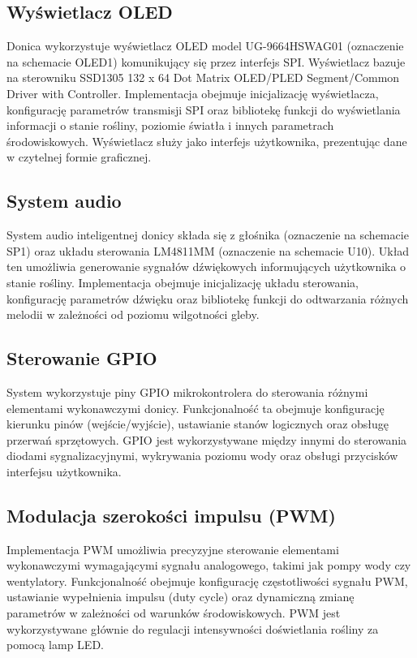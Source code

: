 \documentclass{article}
\begin{document}
\subsection{Wyświetlacz OLED}
Donica wykorzystuje wyświetlacz OLED model UG-9664HSWAG01 (oznaczenie na schemacie OLED1) komunikujący się przez interfejs SPI. Wyświetlacz bazuje na sterowniku SSD1305 132 x 64 Dot Matrix OLED/PLED Segment/Common Driver with Controller. Implementacja obejmuje inicjalizację wyświetlacza, konfigurację parametrów transmisji SPI oraz bibliotekę funkcji do wyświetlania informacji o stanie rośliny, poziomie światła i innych parametrach środowiskowych. Wyświetlacz służy jako interfejs użytkownika, prezentując dane w czytelnej formie graficznej.

\subsection{System audio}
System audio inteligentnej donicy składa się z głośnika (oznaczenie na schemacie SP1) oraz układu sterowania LM4811MM (oznaczenie na schemacie U10). Układ ten umożliwia generowanie sygnałów dźwiękowych informujących użytkownika o stanie rośliny. Implementacja obejmuje inicjalizację układu sterowania, konfigurację parametrów dźwięku oraz bibliotekę funkcji do odtwarzania różnych melodii w zależności od poziomu wilgotności gleby.

\subsection{Sterowanie GPIO}
System wykorzystuje piny GPIO mikrokontrolera do sterowania różnymi elementami wykonawczymi donicy. Funkcjonalność ta obejmuje konfigurację kierunku pinów (wejście/wyjście), ustawianie stanów logicznych oraz obsługę przerwań sprzętowych. GPIO jest wykorzystywane między innymi do sterowania diodami sygnalizacyjnymi, wykrywania poziomu wody oraz obsługi przycisków interfejsu użytkownika.

\subsection{Modulacja szerokości impulsu (PWM)}
Implementacja PWM umożliwia precyzyjne sterowanie elementami wykonawczymi wymagającymi sygnału analogowego, takimi jak pompy wody czy wentylatory. Funkcjonalność obejmuje konfigurację częstotliwości sygnału PWM, ustawianie wypełnienia impulsu (duty cycle) oraz dynamiczną zmianę parametrów w zależności od warunków środowiskowych. PWM jest wykorzystywane głównie do regulacji intensywności doświetlania rośliny za pomocą lamp LED.
\end{document}
